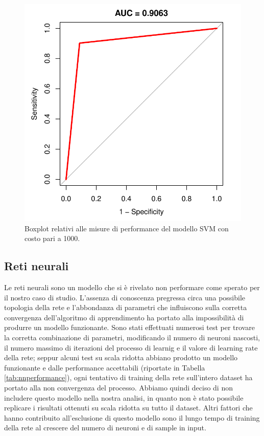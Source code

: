 \begin{figure}[h]
	\centering
	\includegraphics[width=0.7\linewidth]{../FinalResults/Images/svm1000/auc.pdf}
	\caption{Boxplot relativi alle misure di performance del modello SVM con costo pari a 1000.}
	\label{fig:svm1000performance}
\end{figure}
\clearpage
\subsection{Reti neurali}
Le reti neurali sono un modello che si è rivelato non performare come sperato per il nostro caso di studio. L'assenza di conoscenza pregressa circa una possibile topologia della rete e l'abbondanza di parametri che influiscono sulla corretta convergenza dell'algoritmo di apprendimento ha portato alla impossibilità di produrre un modello funzionante. Sono stati effettuati numerosi test per trovare la corretta combinazione di parametri, modificando il numero di neuroni nascosti, il numero massimo di iterazioni del processo di learnig e il valore di learning rate della rete; seppur alcuni test su scala ridotta abbiano prodotto un modello funzionante e dalle performance accettabili (riportate in Tabella \ref{tab:nnperformance}), ogni tentativo di training della rete sull'intero dataset ha portato alla non convergenza del processo. Abbiamo quindi deciso di non includere questo modello nella nostra analisi, in quanto non è stato possibile replicare i risultati ottenuti su scala ridotta su tutto il dataset. Altri fattori che hanno contribuito all'esclusione di questo modello sono il lungo tempo di training della rete al crescere del numero di neuroni e di sample in input.

